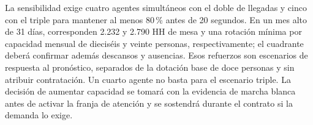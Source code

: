 La sensibilidad exige cuatro agentes simultáneos con el doble de llegadas y cinco con el triple para mantener al menos 80\,\% antes de 20 segundos. En un mes alto de 31 días, corresponden 2.232 y 2.790 HH de mesa y una rotación mínima por capacidad mensual de dieciséis y veinte personas, respectivamente; el cuadrante deberá confirmar además descansos y ausencias. Esos refuerzos son escenarios de respuesta al pronóstico, separados de la dotación base de doce personas y sin atribuir contratación. Un cuarto agente no basta para el escenario triple. La decisión de aumentar capacidad se tomará con la evidencia de marcha blanca antes de activar la franja de atención y se sostendrá durante el contrato si la demanda lo exige.
